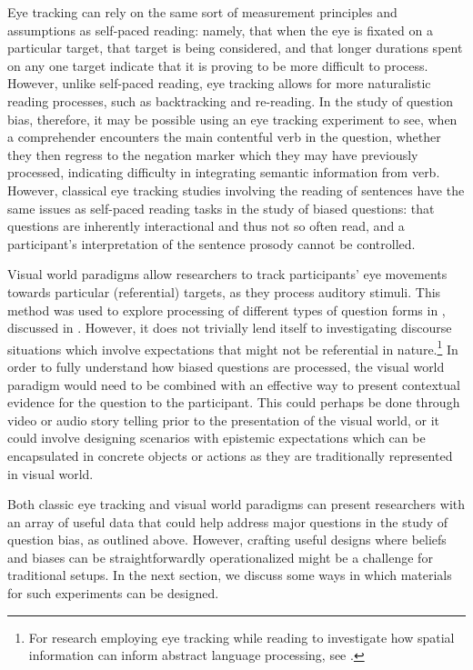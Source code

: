 \documentclass[output=paper,colorlinks,citecolor=brown]{langscibook}
\begin{document}
Eye tracking can rely on the same sort of measurement principles and assumptions as self-paced reading: namely, that when the eye is fixated on a particular target, that target is being considered, and that longer durations spent on any one target indicate that it is proving to be more difficult to process. However, unlike self-paced reading, eye tracking allows for more naturalistic reading processes, such as backtracking and re-reading. In the study of question bias, therefore, it may be possible using an eye tracking experiment to see, when a comprehender encounters the main contentful verb in the question, whether they then regress to the negation marker which they may have previously processed, indicating difficulty in integrating semantic information from verb. 
However, classical eye tracking studies involving the reading of sentences have the same issues as self-paced reading tasks in the study of biased questions: that questions are inherently interactional and thus not so often read, and a participant's interpretation of the sentence prosody cannot be controlled. 

Visual world paradigms \citep{huettig2011using} allow researchers to track participants' eye movements towards particular (referential) targets, as they process auditory stimuli. This method was used to explore processing of different types of question forms in \citet{tian_representing_2021}, discussed in . However, it does not trivially lend itself to investigating discourse situations which involve expectations that might not be referential in nature.\footnote{For research employing eye tracking while reading to investigate how spatial information can inform abstract language processing, see \citet{guerra2014spatial, guerra2017visually}.} In order to fully understand how biased questions are processed, the visual world paradigm would need to be combined with an effective way to present contextual evidence for the question to the participant. This could perhaps be done through video or audio story telling prior to the presentation of the visual world, or it could involve designing scenarios with epistemic expectations which can be encapsulated in concrete objects or actions as they are traditionally represented in visual world.

Both classic eye tracking and visual world paradigms can present researchers with an array of useful data that could help address major questions in the study of question bias, as outlined above. However, crafting useful designs where beliefs and biases can be straightforwardly operationalized might be a challenge for traditional setups. In the next section, we discuss some ways in which materials for such experiments can be designed.
\end{document}
